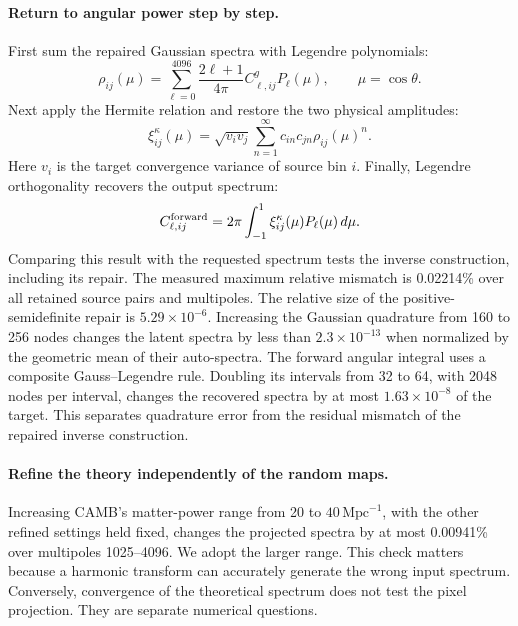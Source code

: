 \documentclass[11pt]{article}
\begin{document}
\paragraph{Return to angular power step by step.}
First sum the repaired Gaussian spectra with Legendre polynomials:
\begin{equation}
 \rho_{ij}(\mu)=\sum_{\ell=0}^{4096}
 \frac{2\ell+1}{4\pi}C_{\ell,ij}^{g}P_\ell(\mu),
 \qquad \mu=\cos\theta.
\end{equation}
Next apply the Hermite relation and restore the two physical amplitudes:
\begin{equation}
 \xi_{ij}^{\kappa}(\mu)=\sqrt{v_i v_j}
 \sum_{n=1}^{\infty}c_{in}c_{jn}\rho_{ij}(\mu)^n.
\end{equation}
Here $v_i$ is the target convergence variance of source bin $i$. Finally,
Legendre orthogonality recovers the output spectrum:
\begin{equation}
 C_{\ell,ij}^{\rm forward}=2\pi\int_{-1}^{1}
 \xi_{ij}^{\kappa}(\mu)P_\ell(\mu)\,d\mu.
\end{equation}
Comparing this result with the requested spectrum tests the inverse
construction, including its repair. The measured maximum relative
mismatch is 0.02214\% over all retained source pairs and multipoles.
The relative size of the positive-semidefinite repair is
$5.29\times10^{-6}$. Increasing the Gaussian quadrature from 160 to
256 nodes changes the latent spectra by less than $2.3\times10^{-13}$
when normalized by the geometric mean of their auto-spectra.
The forward angular integral uses a composite Gauss--Legendre rule.
Doubling its intervals from 32 to 64, with 2048 nodes per interval,
changes the recovered spectra by at most $1.63\times10^{-8}$ of
the target. This separates quadrature error from the residual mismatch
of the repaired inverse construction.

\paragraph{Refine the theory independently of the random maps.}
Increasing CAMB's matter-power range from 20 to $40\,\mathrm{Mpc}^{-1}$,
with the other refined settings held fixed, changes the projected spectra
by at most 0.00941\% over multipoles 1025--4096. We adopt the larger range.
This check matters because a harmonic transform can accurately generate
the wrong input spectrum. Conversely, convergence of the theoretical
spectrum does not test the pixel projection. They are separate numerical
questions.
\end{document}
